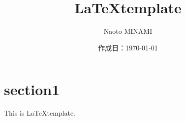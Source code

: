 \documentclass[10pt]{ujarticle}
\title{\LaTeX template}
\author{Naoto MINAMI}
\date{作成日：\today}
\begin{document}
\maketitle

\section{section1}
This is \LaTeX template.
\end{document}

